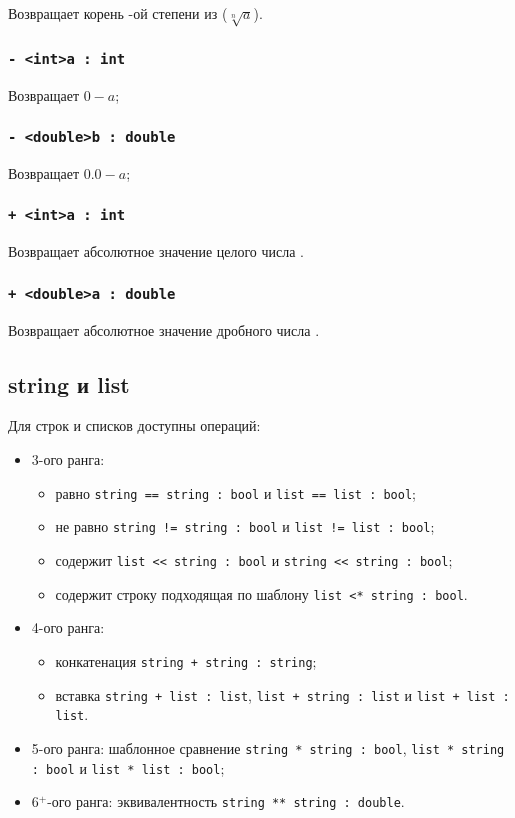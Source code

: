 \documentclass[a4paper, 14pt]{extarticle}
\newenvironment{icItems}
	{ \begin{itemize} [noitemsep,nolistsep] }
	{ \end{itemize} }
\begin{document}
Возвращает корень -ой степени из  ($\sqrt[n]{a}$).


\subsubsection{\lstinline`- <int>a : int`}

Возвращает $0-a$;

\subsubsection{\lstinline`- <double>b : double`}

Возвращает $0.0-a$;

\subsubsection{\lstinline`+ <int>a : int`}

Возвращает абсолютное значение целого числа .

\subsubsection{\lstinline`+ <double>a : double`}

Возвращает абсолютное значение дробного числа .

\subsection{{\color{bluemarin}string} и {\color{bluemarin}list}}

	Для строк и списков доступны операций:
\begin{icItems}
	\item
		3-ого ранга:
		\begin{icItems}
		\item
			равно \lstinline`string == string : bool` и \lstinline`list == list : bool`;
		\item
			не равно \lstinline`string != string : bool` и \lstinline`list != list : bool`;
		\item
			содержит \lstinline`list << string : bool` и \lstinline`string << string : bool`;
		\item
			содержит строку подходящая по шаблону \lstinline`list <* string : bool`.
		\end{icItems}
	\item
		4-ого ранга:
		\begin{icItems}
		\item
			конкатенация \lstinline`string + string : string`;
		\item
			вставка \lstinline`string + list : list`, \lstinline`list + string : list` и \lstinline`list + list : list`.
		\end{icItems}
	\item
		5-ого ранга: шаблонное сравнение \lstinline`string * string : bool`, \lstinline`list * string : bool` и \lstinline`list * list : bool`;
	\item
		6$^+$-ого ранга: эквивалентность \lstinline`string ** string : double`.
\end{icItems}
\end{document}
